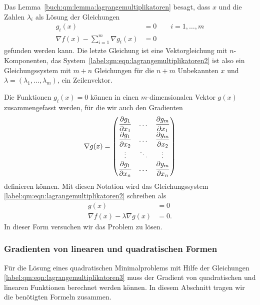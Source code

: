 Das Lemma~\ref{buch:qm:lemma:lagrangemultiplikatoren} besagt, dass
$x$ und die Zahlen $\lambda_i$ als Lösung der Gleichungen
\begin{equation}
\begin{aligned}
g_i(x)&=0\qquad i=1,\dots,m\\
\nabla f(x) -\sum_{i=1}^m \nabla g_i(x)&=0
\end{aligned}
\label{label:qm:eqn:lagrangemultiplikatoren2}
\end{equation}
gefunden werden kann.
Die letzte Gleichung ist eine Vektorgleichung mit $n$-Komponenten,
das System~\eqref{label:qm:eqn:lagrangemultiplikatoren2} ist also
ein Gleichungssystem mit $m+n$ Gleichungen für die $n+m$
Unbekannten $x$ und $\lambda=(\lambda_1,\dots,\lambda_m)$, ein Zeilenvektor.
%

Die Funktionen $g_i(x)=0$ können in einen $m$-dimensionalen Vektor
$g(x)$ zusammengefasst werden, für die wir auch den Gradienten
%
\[
\nabla g(x)
=
\renewcommand\arraystretch{1.25}
\begin{pmatrix}
\displaystyle\frac{\partial g_1}{\partial x_1} & \dots
	& \displaystyle\frac{\partial g_m}{\partial x_1}\\
\displaystyle\frac{\partial g_1}{\partial x_2} & \dots
	& \displaystyle\frac{\partial g_m}{\partial x_2}\\
\vdots & \ddots & \vdots \\
\displaystyle\frac{\partial g_1}{\partial x_n} & \dots
	& \displaystyle\frac{\partial g_m}{\partial x_n}
\end{pmatrix}
\]
definieren können.
Mit diesen Notation wird das Gleichungssystem
\eqref{label:qm:eqn:lagrangemultiplikatoren2}
schreiben als
\begin{equation}
\begin{aligned}
g(x)&=0\\
\nabla f(x) - \lambda  \nabla g(x) &= 0.
\end{aligned}
\label{label:qm:eqn:lagrangemultiplikatoren3}
\end{equation}
In dieser Form versuchen wir das Problem zu lösen.

%
%
\subsubsection{Gradienten von linearen und quadratischen Formen}
Für die Lösung eines quadratischen Minimalproblems mit Hilfe der Gleichungen
\eqref{label:qm:eqn:lagrangemultiplikatoren3} muss der Gradient
von quadratischen und linearen Funktionen berechnet werden können.
In diesem Abschnitt tragen wir die benötigten Formeln zusammen.

